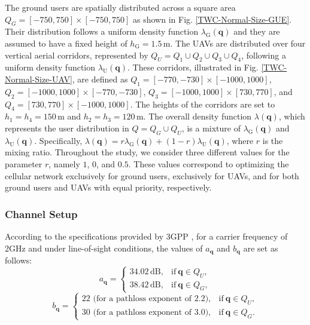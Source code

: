 The ground users are spatially distributed across a square area  $Q_G = [-750, 750] \times [-750, 750]$ as shown in Fig. \ref{TWC-Normal-Size-GUE}. Their distribution follows a uniform density function $\lambda_\textrm{G}(\bm{q})$ and they are assumed to have a fixed height of $h_\textrm{G} = 1.5$\,m. The UAVs are distributed over four vertical aerial corridors, represented by $Q_U = Q_1\cup Q_2\cup Q_3 \cup Q_4$, following a uniform density function $\lambda_\textrm{U}(\bm{q})$. These corridors, illustrated in Fig. \ref{TWC-Normal-Size-UAV}, are defined as $Q_1 = [-770, -730]\times [-1000, 1000]$, $Q_2 = [-1000, 1000]\times [-770, -730]$, $Q_3 = [-1000, 1000]\times [730, 770]$, and $Q_4 = [730, 770]\times [-1000, 1000]$. The heights of the corridors are set to $h_1 = h_4 = 150$\,m and $h_2 = h_3 = 120$\,m. The overall density function $\lambda(\bm{q})$, which represents the user distribution in $Q = Q_G \cup Q_U$, is a mixture of $\lambda_\textrm{G}(\bm{q})$ and $\lambda_\textrm{U}(\bm{q})$. Specifically, $\lambda(\bm{q}) = r\lambda_\textrm{G}(\bm{q}) + (1-r) \lambda_\textrm{U}(\bm{q})$, where $r$ is the mixing ratio. Throughout the study, we consider three different values for the parameter $r$, namely $1$, $0$, and $0.5$. These values correspond to optimizing the cellular network exclusively for ground users, exclusively for UAVs, and for both ground users and UAVs with equal priority, respectively.



\subsubsection{Channel Setup}\label{Channel-Setup}

According to the specifications provided by 3GPP \cite{3GPP36777,3GPP38901}, for a carrier frequency of 2GHz and under line-of-sight conditions, the values of $a_{\bm{q}}$ and $b_{\bm{q}}$ are set as follows:
\begin{equation}\label{a_q_values}
a_{\bm{q}} =
\begin{cases}
34.02\,\textrm{dB}, & \text{if}\ \bm{q}\in Q_U, \\
38.42\,\textrm{dB}, & \text{if}\ \bm{q}\in Q_G,
\end{cases}
\end{equation}
\begin{equation}\label{b_q_values}
b_{\bm{q}} =
\begin{cases}
22 \textrm{ (for a pathloss exponent of 2.2)}, & \text{if}\ \bm{q}\in Q_U, \\
30 \textrm{ (for a pathloss exponent of 3.0)}, & \text{if}\ \bm{q}\in Q_G.
\end{cases}
\end{equation}

